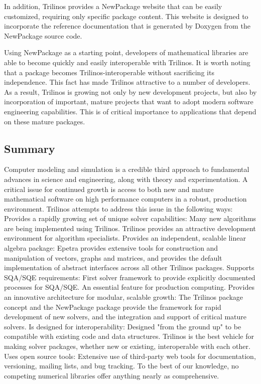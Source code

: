 \documentclass[]{llncs}      %
\begin{document}
In addition, Trilinos provides a NewPackage website that can be easily
customized, requiring only specific package content.  This website is
designed to incorporate the reference documentation that is generated by
Doxygen from the NewPackage source code.

Using NewPackage as a starting point, developers of mathematical
libraries are able to become quickly and easily interoperable with
Trilinos.  It is worth noting that a package becomes
Trilinos-interoperable without sacrificing its independence.  This fact
has made Trilinos attractive to a number of developers.  As a result,
Trilinos is growing not only by new development projects, but also by
incorporation of important, mature projects that want to adopt modern
software engineering capabilities.  This is of critical importance to
applications that depend on these mature packages.


\subsection*{Summary}

Computer modeling and simulation is a credible third approach to
fundamental advances in science and engineering, along with theory and
experimentation.  A critical issue for continued growth is access to
both new and mature mathematical software on high performance computers
in a robust, production environment.  Trilinos attempts to address this
issue in the following ways: Provides a rapidly growing set of unique
solver capabilities: Many new algorithms are being implemented using
Trilinos. Trilinos provides an attractive development environment for
algorithm specialists.  Provides an independent, scalable linear algebra
package: Epetra provides extensive tools for construction and
manipulation of vectors, graphs and matrices, and provides the default
implementation of abstract interfaces across all other Trilinos
packages.  Supports SQA/SQE requirements: First solver framework to
provide explicitly documented processes for SQA/SQE.  An essential
feature for production computing.  Provides an innovative architecture
for modular, scalable growth: The Trilinos package concept and the
NewPackage package provide the framework for rapid development of new
solvers, and the integration and support of critical mature solvers.  Is
designed for interoperability: Designed "from the ground up" to be
compatible with existing code and data structures.  Trilinos is the best
vehicle for making solver packages, whether new or existing,
interoperable with each other.  Uses open source tools: Extensive use of
third-party web tools for documentation, versioning, mailing lists, and
bug tracking. To the best of our knowledge, no competing numerical
libraries offer anything nearly as comprehensive.
\end{document}
